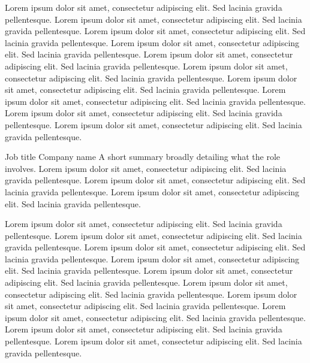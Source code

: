 \documentclass[letterpaper]{ReadableCV}
\begin{document}
{Lorem ipsum dolor sit amet, consectetur adipiscing elit. Sed lacinia gravida pellentesque. Lorem ipsum dolor sit amet, consectetur adipiscing elit. Sed lacinia gravida pellentesque.}
{Lorem ipsum dolor sit amet, consectetur adipiscing elit. Sed lacinia gravida pellentesque. Lorem ipsum dolor sit amet, consectetur adipiscing elit. Sed lacinia gravida pellentesque.}
{Lorem ipsum dolor sit amet, consectetur adipiscing elit. Sed lacinia gravida pellentesque. Lorem ipsum dolor sit amet, consectetur adipiscing elit. Sed lacinia gravida pellentesque.}
{Lorem ipsum dolor sit amet, consectetur adipiscing elit. Sed lacinia gravida pellentesque. Lorem ipsum dolor sit amet, consectetur adipiscing elit. Sed lacinia gravida pellentesque.}
{Lorem ipsum dolor sit amet, consectetur adipiscing elit. Sed lacinia gravida pellentesque. Lorem ipsum dolor sit amet, consectetur adipiscing elit. Sed lacinia gravida pellentesque.}

{Job title}
{Company name}
{A short summary broadly detailing what the role involves. Lorem ipsum dolor sit amet, consectetur adipiscing elit. Sed lacinia gravida pellentesque. Lorem ipsum dolor sit amet, consectetur adipiscing elit. Sed lacinia gravida pellentesque. Lorem ipsum dolor sit amet, consectetur adipiscing elit. Sed lacinia gravida pellentesque.}

{Lorem ipsum dolor sit amet, consectetur adipiscing elit. Sed lacinia gravida pellentesque. Lorem ipsum dolor sit amet, consectetur adipiscing elit. Sed lacinia gravida pellentesque.}
{Lorem ipsum dolor sit amet, consectetur adipiscing elit. Sed lacinia gravida pellentesque. Lorem ipsum dolor sit amet, consectetur adipiscing elit. Sed lacinia gravida pellentesque.}
{Lorem ipsum dolor sit amet, consectetur adipiscing elit. Sed lacinia gravida pellentesque. Lorem ipsum dolor sit amet, consectetur adipiscing elit. Sed lacinia gravida pellentesque.}
{Lorem ipsum dolor sit amet, consectetur adipiscing elit. Sed lacinia gravida pellentesque. Lorem ipsum dolor sit amet, consectetur adipiscing elit. Sed lacinia gravida pellentesque.}
{Lorem ipsum dolor sit amet, consectetur adipiscing elit. Sed lacinia gravida pellentesque. Lorem ipsum dolor sit amet, consectetur adipiscing elit. Sed lacinia gravida pellentesque.}
\end{document}
